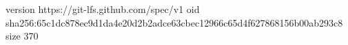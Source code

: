 version https://git-lfs.github.com/spec/v1
oid sha256:65c1dc878ec9d1da4e20d2b2adce63cbec12966c65d4f627868156b00ab293c8
size 370
